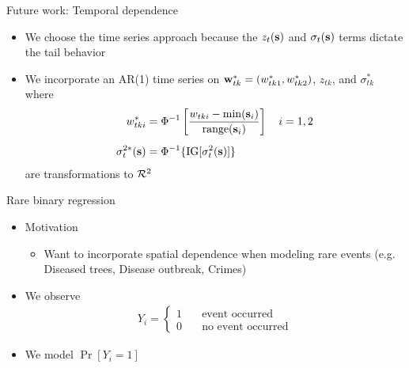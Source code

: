 \documentclass{beamer}
\begin{document}
\begin{frame}{Future work: Temporal dependence}
  \begin{itemize} \setlength{\itemsep}{1em}
    \item We choose the time series approach because the $z_t(\mbox{\bf s})$ and $\sigma_t(\mbox{\bf s})$ terms dictate the tail behavior
    \item We incorporate an AR(1) time series on $\mbox{\bf w}^*_{tk} = (w^*_{tk1}, w^*_{tk2})$, $z_{tk}$, and $\sigma^*_{tk}$ where
    \begin{align*}
      w^*_{tki} &= \Phi^{-1}\left[ \frac{w_{tki} - \min(\mbox{\bf s}_i)}{ \text{range}(\mbox{\bf s}_i)}\right] \quad i = 1, 2 \\[0.5em]
      \sigma^{2*}_t(\mbox{\bf s}) &= \Phi^{-1}\{ \text{IG}[\sigma^2_t(\mbox{\bf s})] \}
    \end{align*}
    are transformations to ${\cal R}^2$
  \end{itemize}
\end{frame}

\begin{frame}{Rare binary regression}
  \begin{itemize} \setlength{\itemsep}{1em}
    \item Motivation
    \begin{itemize}
      \item Want to incorporate spatial dependence when modeling rare events (e.g. Diseased trees, Disease outbreak, Crimes)
    \end{itemize}
    \item We observe
    \begin{align*}
      Y_i = \left\{ \begin{array}{ll}
        1 \quad & \text{event occurred}\\
        0 \quad & \text{no event occurred}
      \end{array} \right.
    \end{align*}
    \item We model $\Pr[Y_i = 1]$
  \end{itemize}
\end{frame}
\end{document}
